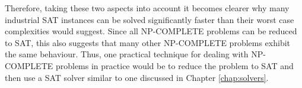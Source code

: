 Therefore, taking these two aspects into account it becomes clearer why many industrial SAT instances can
be solved significantly faster than their worst case complexities would suggest.
Since all NP-COMPLETE problems can be reduced to SAT, this also suggests that many
other NP-COMPLETE problems exhibit the same behaviour.
Thus, one practical technique for dealing with NP-COMPLETE problems in practice
would be to reduce the problem to SAT and then use a SAT solver similar to one discussed
in Chapter \ref{chap:solvers}.
